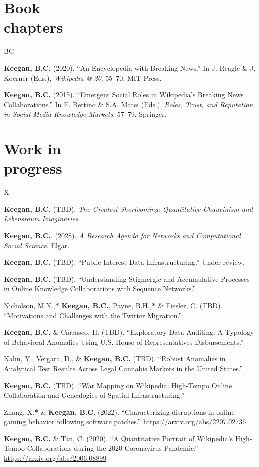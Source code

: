 \documentclass{cv}
\begin{document}
	\section{Book\\chapters}
	\begin{entries}{BC}
		\item \textbf{Keegan, B.C.} (2020). ``An Encyclopedia with Breaking News.'' In J. Reagle \& J. Koerner (Eds.), \textit{Wikipedia @ 20}, 55--70. MIT Press. 
		\item \textbf{Keegan, B.C.} (2015). ``Emergent Social Roles in Wikipedia's Breaking News Collaborations.'' In E. Bertino \& S.A. Matei (Eds.), \textit{Roles, Trust, and Reputation in Social Media Knowledge Markets}, 57--79. Springer. 
	\end{entries}

	\section{Work in\\progress}
	\begin{entries}{X}
		\item \textbf{Keegan, B.C.} (TBD). \textit{The Greatest Shortcoming: Quantitative Chauvinism and Lebensraum Imaginaries}.
		\item \textbf{Keegan, B.C.}. (2028). \textit{A Research Agenda for Networks and Computational Social Science}. Elgar.
		\item \textbf{Keegan, B.C.} (TBD). ``Public Interest Data Infrastructuring.'' Under review.
		\item \textbf{Keegan, B.C.} (TBD). ``Understanding Stigmergic and Accumulative Processes in Online Knowledge Collaborations with Sequence Networks.''
		\item Nicholson, M.N.,\textbf{*} \textbf{Keegan, B.C.}, Payne, B.H.,\textbf{*} \& Fiesler, C. (TBD). ``Motivations and Challenges with the Twitter Migration.''
		\item \textbf{Keegan, B.C.} \& Carrasco, H. (TBD). ``Exploratory Data Auditing: A Typology of Behavioral Anomalies Using U.S. House of Representatives Disbursements.''
		\item Kahn, Y., Vergara, D., \& \textbf{Keegan, B.C.} (TBD). ``Robust Anomalies in Analytical Test Results Across Legal Cannabis Markets in the United States.''
		\item \textbf{Keegan, B.C.} (TBD). ``War Mapping on Wikipedia: High-Tempo Online Collaboration and Genealogies of Spatial Infrastructuring.''
		\item Zhang, X.\textbf{*} \& \textbf{Keegan, B.C.} (2022). ``Characterizing disruptions in online gaming behavior following software patches.'' \url{https://arxiv.org/abs/2207.02736}
		\item \textbf{Keegan, B.C.} \& Tan, C. (2020). ``A Quantitative Portrait of Wikipedia's High-Tempo Collaborations during the 2020 Coronavirus Pandemic.'' \url{https://arxiv.org/abs/2006.08899}
	\end{entries}
\end{document}
